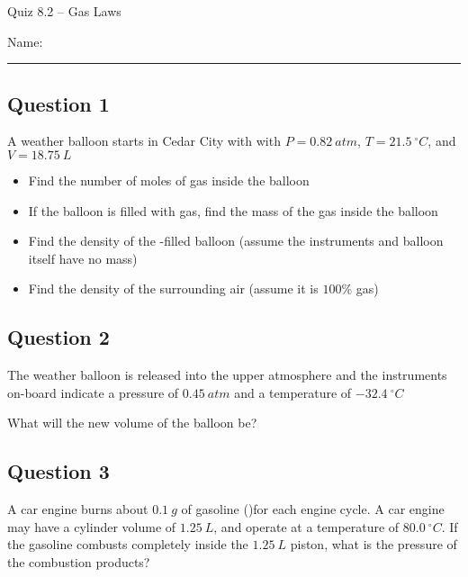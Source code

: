 \documentclass[11pt, letterpaper]{memoir}
\begin{document}
	\begin{center}
		{\large Quiz 8.2 --	Gas Laws}
	\end{center}
	{\large Name: \rule[-1mm]{4in}{.1pt} 

\subsection*{Question 1}
A weather balloon starts in Cedar City with with $P=0.82~atm$, $T=21.5~^\circ C$, and $V=18.75~L$

\begin{itemize}
	\item Find the number of moles of gas inside the balloon
	
	\vspace{2em}
	\item If the balloon is filled with  gas, find the mass of the gas inside the balloon
	
	\vspace{2em}
	\item Find the density of the -filled balloon (assume the instruments and balloon itself have no mass)
	
	\vspace{2em}
	\item Find the density of the surrounding air (assume it is $100\%$  gas)
\end{itemize}
	
\vspace{2em}
\subsection*{Question 2}
The weather balloon is released into the upper atmosphere and the instruments on-board indicate a pressure of $0.45~atm$ and a temperature of $-32.4~^\circ C$

\noindent What will the new volume of the balloon be?

\vspace{4em}
\subsection*{Question 3}
A car engine burns about $0.1~g$ of gasoline ()for each engine cycle. A car engine may have a cylinder volume of $1.25~L$, and operate at a temperature of $80.0~^\circ C$. If the gasoline combusts completely inside the $1.25~L$ piston, what is the pressure of the combustion products?

\newpage
{}
\pagestyle{empty}
\addtocounter{page}{-1}
}
\end{document}
